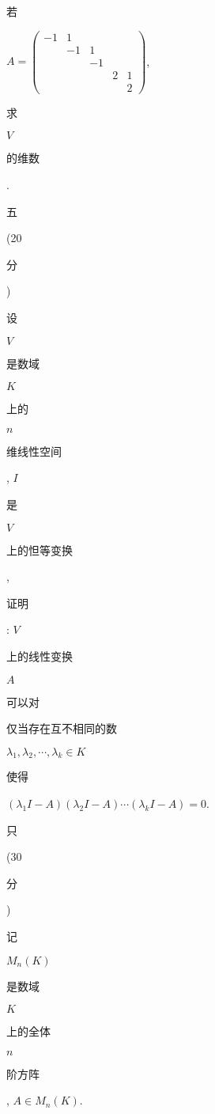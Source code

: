 \documentclass[10pt]{article}
\begin{document}
\begin{CJK}{UTF8}{mj}若\end{CJK} $A=\left(\begin{array}{ccccc}-1 & 1 & & & \\ & -1 & 1 & & \\ & & -1 & & \\ & & & 2 & 1 \\ & & & & 2\end{array}\right)$, \begin{CJK}{UTF8}{mj}求\end{CJK} $V$ \begin{CJK}{UTF8}{mj}的维数\end{CJK}.

\begin{CJK}{UTF8}{mj}五\end{CJK} (20 \begin{CJK}{UTF8}{mj}分\end{CJK}) \begin{CJK}{UTF8}{mj}设\end{CJK} $V$ \begin{CJK}{UTF8}{mj}是数域\end{CJK} $K$ \begin{CJK}{UTF8}{mj}上的\end{CJK} $n$ \begin{CJK}{UTF8}{mj}维线性空间\end{CJK}, $I$ \begin{CJK}{UTF8}{mj}是\end{CJK} $V$ \begin{CJK}{UTF8}{mj}上的怛等变换\end{CJK}, \begin{CJK}{UTF8}{mj}证明\end{CJK}: $V$ \begin{CJK}{UTF8}{mj}上的线性变换\end{CJK} $A$ \begin{CJK}{UTF8}{mj}可以对\end{CJK} \begin{CJK}{UTF8}{mj}仅当存在互不相同的数\end{CJK} $\lambda_{1}, \lambda_{2}, \cdots, \lambda_{k} \in K$ \begin{CJK}{UTF8}{mj}使得\end{CJK} $\left(\lambda_{1} I-A\right)\left(\lambda_{2} I-A\right) \cdots\left(\lambda_{k} I-A\right)=0$.

\begin{CJK}{UTF8}{mj}只\end{CJK}(30 \begin{CJK}{UTF8}{mj}分\end{CJK}) \begin{CJK}{UTF8}{mj}记\end{CJK} $M_{n}(K)$ \begin{CJK}{UTF8}{mj}是数域\end{CJK} $K$ \begin{CJK}{UTF8}{mj}上的全体\end{CJK} $n$ \begin{CJK}{UTF8}{mj}阶方阵\end{CJK}, $A \in M_{n}(K)$.
\end{document}
